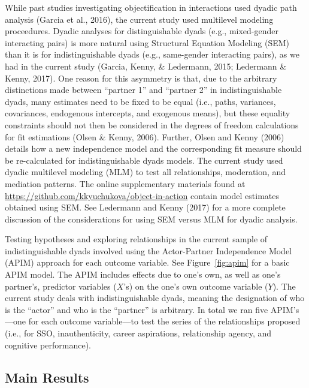 \documentclass[man]{apa6}
\begin{document}
While past studies investigating objectification in interactions used
dyadic path analysis (Garcia et al., 2016), the current study used
multilevel modeling proceedures. Dyadic analyses for distinguishable
dyads (e.g., mixed-gender interacting pairs) is more natural using
Structural Equation Modeling (SEM) than it is for indistinguishable
dyads (e.g., same-gender interacting pairs), as we had in the current
study (Garcia, Kenny, \& Ledermann, 2015; Ledermann \& Kenny, 2017). One
reason for this asymmetry is that, due to the arbitrary distinctions
made between \enquote{partner 1} and \enquote{partner 2} in
indistinguishable dyads, many estimates need to be fixed to be equal
(i.e., paths, variances, covariances, endogenous intercepts, and
exogenous means), but these equality constraints should not then be
considered in the degrees of freedom calculations for fit estimations
(Olsen \& Kenny, 2006). Further, Olsen and Kenny (2006) details how a
new independence model and the corresponding fit measure should be
re-calculated for indistinguishable dyads models. The current study used
dyadic multilevel modeling (MLM) to test all relationships, moderation,
and mediation patterns. The online supplementary materials found at
\url{https://github.com/kkyuchukova/object-in-action} contain model
estimates obtained using SEM. See Ledermann and Kenny (2017) for a more
complete discussion of the considerations for using SEM versus MLM for
dyadic analysis.

Testing hypotheses and exploring relationships in the current sample of
indistinguishable dyads involved using the Actor-Partner Independence
Model (APIM) approach for each outcome variable. See
Figure~\ref{fig:apim} for a basic APIM model. The APIM includes effects
due to one's own, as well as one's partner's, predictor variables
(\(X\)'s) on the one's own outcome variable (\(Y\)). The current study
deals with indistinguishable dyads, meaning the designation of who is
the \enquote{actor} and who is the \enquote{partner} is arbitrary. In
total we ran five APIM's---one for each outcome variable---to test the
series of the relationships proposed (i.e., for SSO, inauthenticity,
career aspirations, relationship agency, and cognitive performance).

\subsection{Main Results}\label{main-results}
\end{document}
